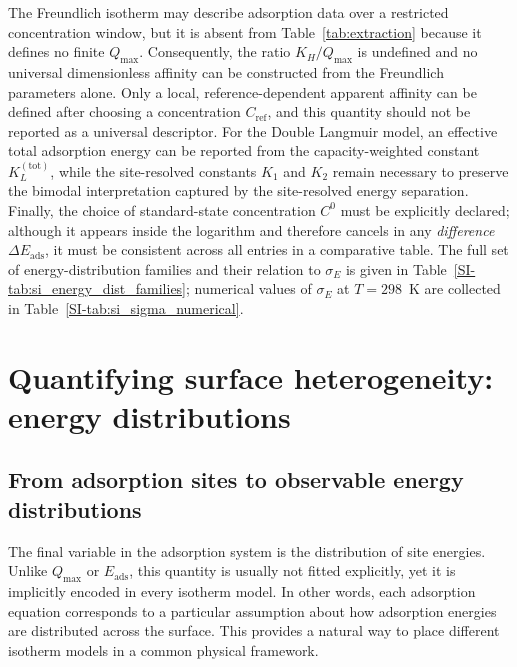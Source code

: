 \documentclass[journal=jacsat,manuscript=article]{achemso}
\begin{document}
	The Freundlich isotherm may describe adsorption data over a restricted concentration window, but it is absent from Table~\ref{tab:extraction} because it defines no finite $Q_{\max}$. Consequently, the ratio $K_H/Q_{\max}$ is undefined and no universal dimensionless affinity can be constructed from the Freundlich parameters alone. Only a local, reference-dependent apparent affinity can be defined after choosing a concentration $C_{\mathrm{ref}}$, and this quantity should not be reported as a universal descriptor. For the Double Langmuir model, an effective total adsorption energy can be reported from the capacity-weighted constant $K_L^{\mathrm{(tot)}}$, while the site-resolved constants $K_1$ and $K_2$ remain necessary to preserve the bimodal interpretation captured by the site-resolved energy separation. Finally, the choice of standard-state concentration $C^{0}$ must be explicitly declared; although it appears inside the logarithm and therefore cancels in any \emph{difference} $\Delta E_{\mathrm{ads}}$, it must be consistent across all entries in a comparative table. The full set of energy-distribution families and their relation to $\sigma_E$ is given in Table~\ref{SI-tab:si_energy_dist_families}; numerical values of $\sigma_E$ at $T = 298$~K are collected in Table~\ref{SI-tab:si_sigma_numerical}.
	\section{Quantifying surface heterogeneity: energy distributions}
	\label{sec:heterogeneity}
	
	\subsection{From adsorption sites to observable energy distributions}
	\label{sec:condensation}
	
	The final variable in the adsorption system is the distribution of site energies. Unlike $Q_{\max}$ or $E_{\mathrm{ads}}$, this quantity is usually not fitted explicitly, yet it is implicitly encoded in every isotherm model. In other words, each adsorption equation corresponds to a particular assumption about how adsorption energies are distributed across the surface. This provides a natural way to place different isotherm models in a common physical framework.
	
\end{document}
